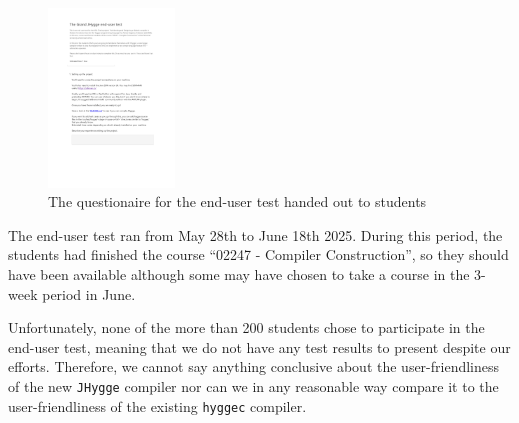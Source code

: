 \begin{figure}[H]
\centering
\includegraphics[width=0.3\textwidth]{Pictures/the_grand_jhygge_end_user_test.pdf}
\caption{The questionaire for the end-user test handed out to students}
\label{fig:end_user_test}
\end{figure}

The end-user test ran from May 28th to June 18th 2025. During this period, the students had finished the course ``02247 - Compiler Construction'',
so they should have been available although some may have chosen to take a course in the 3-week period in June.

Unfortunately, none of the more than 200 students chose to participate in the end-user test, meaning that we do not have any test results
to present despite our efforts. Therefore, we cannot say anything conclusive about the user-friendliness of the new \texttt{JHygge} compiler
nor can we in any reasonable way compare it to the user-friendliness of the existing \texttt{hyggec} compiler.
